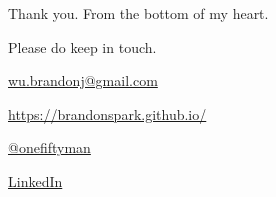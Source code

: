 \documentclass[aspectratio=169, handout]{beamer}
\begin{document}
\begin{frame}[plain]
	\begin{center}
    {\large
    Thank you. From the bottom of my heart.
    }

    \vspace{20pt}

    Please do keep in touch.

    \vspace{10pt}

    {\color{blue}\href{mailto://wu.brandonj@gmail.com}{wu.brandonj@gmail.com}}

    {\color{blue}\href{https://brandonspark.github.io/}{https://brandonspark.github.io/}}

    {\color{blue}\href{https://twitter.com/onefiftyman}{@onefiftyman}}

    {\color{blue}\href{https://www.linkedin.com/in/brandon-wu-79935116b/}{LinkedIn}}

  \end{center}
\end{frame}
\end{document}
